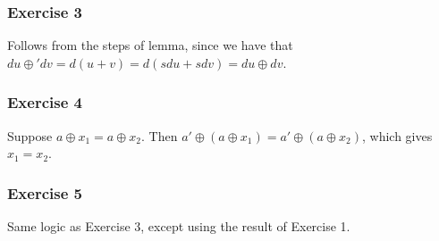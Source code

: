 \subsubsection{Exercise 3}
Follows from the steps of lemma, since we have that $du \oplus' dv = d(u + v) = d(sdu + sdv) = du \oplus dv$.

\subsubsection{Exercise 4}
Suppose $a \oplus x_1 = a \oplus x_2$. Then $a' \oplus (a \oplus x_1) = a' \oplus (a \oplus x_2)$,
which gives $x_1 = x_2$.

\subsubsection{Exercise 5}
Same logic as Exercise 3, except using the result of Exercise 1.
